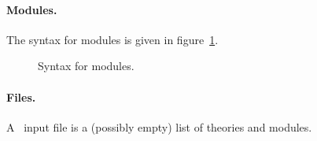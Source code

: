 \paragraph{Modules.}
The syntax for modules is given in figure~\ref{fig:bnf:module}.
\begin{figure}[p]
  \begin{center}\framebox{}\end{center}
  \caption{Syntax for modules.}
\label{fig:bnf:module}
\end{figure}

\paragraph{Files.}
A \whyml\ input file is a (possibly empty) list of theories and modules.
\begin{center}\framebox{}\end{center}


